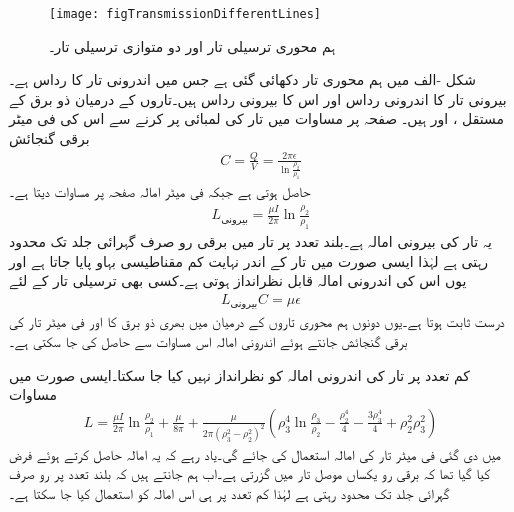 \begin{figure}
\centering
\texttt{[image: figTransmissionDifferentLines]}
\caption{ہم محوری ترسیلی تار اور دو متوازی ترسیلی تار۔}
\label{شکل_ترسیل_مختلف_ترسیلی_تار}
\end{figure}
شکل -الف میں ہم محوری تار دکھائی گئی ہے جس میں اندرونی تار کا رداس  ہے۔بیرونی تار کا اندرونی رداس  اور اس کا بیرونی رداس  ہیں۔تاروں کے درمیان ذو برق کے مستقل ،   اور  ہیں۔ صفحہ  پر مساوات میں تار کی لمبائی  پر کرنے سے اس کی فی میٹر برقی گنجائش
 \begin{align}
C=\frac{Q}{V}=\frac{2\pi\epsilon }{\ln \frac{\rho_2}{\rho_1}}
\end{align}
حاصل ہوتی ہے جبکہ فی میٹر امالہ صفحہ  پر مساوات  دیتا ہے۔
\begin{align}
L_{\text{بیرونی}}=\frac{\mu  I }{2\pi} \ln \frac{\rho_2}{\rho_1}
\end{align}
یہ تار کی بیرونی امالہ ہے۔بلند تعدد پر تار میں برقی رو صرف گہرائی جلد تک محدود رہتی ہے لہٰذا ایسی صورت میں تار کے اندر نہایت کم مقناطیسی بہاو پایا جاتا ہے اور یوں اس کی  اندرونی امالہ قابل نظرانداز ہوتی ہے۔کسی بھی ترسیلی تار کے لئے
\begin{align}\label{مساوات_ترسیلی_امالہ_کپیسٹنس_عمومی_تعلق}
L_{\text{بیرونی}} C=\mu \epsilon
\end{align}
درست ثابت ہوتا ہے۔یوں دونوں ہم محوری تاروں کے درمیان  میں بھری ذو برق کا  اور فی میٹر تار کی برقی گنجائش جانتے ہوئے اندرونی امالہ اس مساوات سے حاصل کی جا سکتی ہے۔

کم تعدد پر تار کی اندرونی امالہ کو نظرانداز نہیں کیا جا سکتا۔ایسی صورت میں مساوات 
\begin{align}\label{مساوات_ترسیلی_کم_تعددی_امالہ}
L=\frac{\mu  I }{2\pi} \ln \frac{\rho_2}{\rho_1}+\frac{\mu }{8\pi}+\frac{\mu}{2\pi \left(\rho_3^2-\rho_2^2\right)^2}\left(\rho_3^4 \ln \frac{\rho_3}{\rho_2}-\frac{\rho_2^4}{4}-\frac{3\rho_3^4}{4}+\rho_2^2 \rho_3^2\right)
\end{align}
میں دی گئی فی میٹر تار کی امالہ استعمال کی جائے گی۔یاد رہے کہ یہ امالہ حاصل کرتے ہوئے فرض کیا گیا تھا کہ برقی رو یکساں موصل تار میں گزرتی ہے۔اب ہم جانتے ہیں کہ بلند تعدد پر رو صرف گہرائی جلد تک محدود رہتی ہے لہٰذا کم تعدد پر ہی اس امالہ کو استعمال کیا جا سکتا ہے۔

